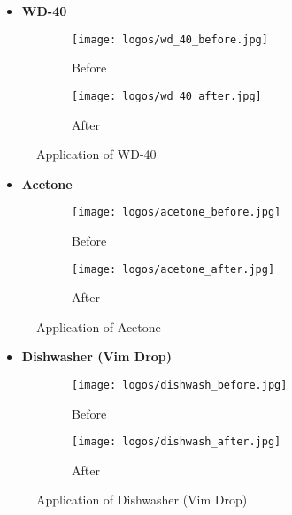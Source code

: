 \documentclass[table,french,english]{rapportCS}
\begin{document}
\begin{itemize}[label=$\bullet$]
        \item \textbf{WD-40} 
    \end{itemize}
\begin{figure}[h]
    \centering
    \begin{subfigure}{0.37\textwidth}
        \centering
        \texttt{[image: logos/wd\_40\_before.jpg]}
        \caption{Before}
    \end{subfigure}\hspace{0.1\textwidth}%
    \begin{subfigure}{0.37\textwidth}
        \centering
        \texttt{[image: logos/wd\_40\_after.jpg]}
        \caption{After}
    \end{subfigure}
    \caption{Application of WD-40}
\end{figure}
\begin{itemize}[label=$\bullet$]
        \item \textbf{Acetone} 
    \end{itemize}
\begin{figure}[h]
    \centering
    \begin{subfigure}{0.37\textwidth}
        \centering
        \texttt{[image: logos/acetone\_before.jpg]}
        \caption{Before}
    \end{subfigure}\hspace{0.1\textwidth}%
    \begin{subfigure}{0.37\textwidth}
        \centering
        \texttt{[image: logos/acetone\_after.jpg]}
        \caption{After}
    \end{subfigure}
    \caption{Application of Acetone}
\end{figure}
\newpage

\begin{itemize}[label=$\bullet$]
        \item \textbf{Dishwasher (Vim Drop)} 
    \end{itemize}
\begin{figure}[h]
    \centering
    \begin{subfigure}{0.37\textwidth}
        \centering
        \texttt{[image: logos/dishwash\_before.jpg]}
        \caption{Before}
    \end{subfigure}\hspace{0.1\textwidth}%
    \begin{subfigure}{0.37\textwidth}
        \centering
        \texttt{[image: logos/dishwash\_after.jpg]}
        \caption{After}
    \end{subfigure}
    \caption{Application of Dishwasher (Vim Drop)}
\end{figure}
\end{document}
